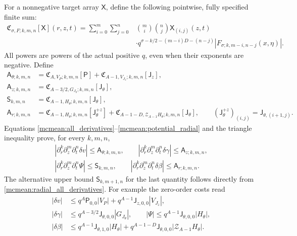 \documentclass[11pt]{article}
\begin{document}
For a nonnegative target array \(\mathsf X\), define the following
pointwise, fully specified finite sum:
\begin{equation}\label{mcmean:cost_operator}
\begin{split}
 \mathfrak C_{\sigma,F;k,m,n}[\mathsf X](r,z,t)
  =\sum_{i=0}^m\sum_{j=0}^n&\binom mi\binom nj\mathsf X_{(i,j)}(z,t)\\
 &\cdot q^{\sigma-k/2-(m-i)D-(n-j)}
       |F_{\sigma;k,m-i,n-j}(x,\eta)|.
\end{split}
\end{equation}
All powers are powers of the actual positive \(q\), even when their
exponents are negative. Define
\begin{equation}\label{mcmean:velocity_arrays}
\begin{split}
 \mathsf A_{\theta;k,m,n}
    &=\mathfrak C_{A,V_P;k,m,n}[\mathsf P]
        +\mathfrak C_{A-1,V_{J_z};k,m,n}[\mathsf J_z],\\
 \mathsf A_{z;k,m,n}
    &=\mathfrak C_{A-3/2,G_{J_\theta};k,m,n}[\mathsf J_\theta],\\
 \mathsf S_{k,m,n}
    &=\mathfrak C_{A-1,H_\theta;k,m,n}[\mathsf J_\theta],\\
 \mathsf A_{r;k,m,n}
    &=\mathfrak C_{A-1,H_\theta;k,m,n}[\mathsf J_\theta^{+z}]
      +\mathfrak C_{A-1-D,\mathcal Z_{A-1}H_\theta;k,m,n}
                                                 [\mathsf J_\theta],
 \qquad (\mathsf J_\theta^{+z})_{(i,j)}=\mathsf J_{\theta,(i+1,j)}.
\end{split}
\end{equation}
Equations \eqref{mcmean:all_derivatives}--\eqref{mcmean:potential_radial}
and the triangle inequality prove, for every \(k,m,n\),
\begin{equation}\label{mcmean:velocity_bounds}
\begin{gathered}
 |\partial_r^k\partial_z^m\partial_t^n\delta v|
       \le\mathsf A_{\theta;k,m,n},\qquad
 |\partial_r^k\partial_z^m\partial_t^n\delta\gamma|
       \le\mathsf A_{z;k,m,n},\\
 |\partial_r^k\partial_z^m\partial_t^n\Psi|
       \le\mathsf S_{k,m,n},\qquad
 |\partial_r^k\partial_z^m\partial_t^n\delta\beta|
       \le\mathsf A_{r;k,m,n}.
\end{gathered}
\end{equation}
The alternative upper bound \(\mathsf S_{k,m+1,n}\) for the last
quantity follows directly from \eqref{mcmean:radial_all_derivatives}.
For example the zero-order costs read
\[
\begin{split}
 |\delta v|&\le q^A\mathsf P_{0,0}|V_P|
                    +q^{A-1}\mathsf J_{z,0,0}|V_{J_z}|,\\
 |\delta\gamma|&\le q^{A-3/2}\mathsf J_{\theta,0,0}|G_{J_\theta}|,
 \qquad |\Psi|\le q^{A-1}\mathsf J_{\theta,0,0}|H_\theta|,\\
 |\delta\beta|&\le q^{A-1}\mathsf J_{\theta,1,0}|H_\theta|
       +q^{A-1-D}\mathsf J_{\theta,0,0}|\mathcal Z_{A-1}H_\theta|.
\end{split}
\]
\end{document}
